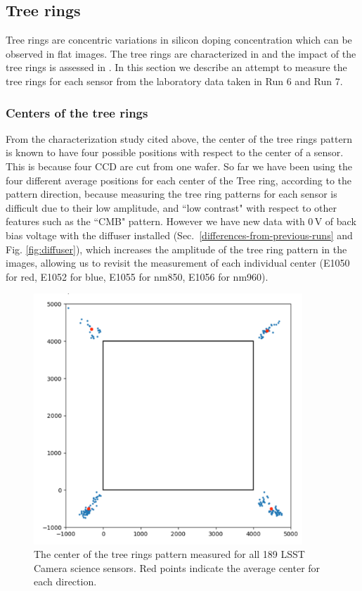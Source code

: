 \subsection{Tree rings}\label{tree-rings}
Tree rings are concentric variations in silicon doping concentration which can be observed in flat images. The tree rings are characterized in \citet{2017Jinst..12C05015,2020JATIS...6a1005P} and the impact of the tree rings is assessed in \citet{2023PASP..135k5003E}. In this section we describe an attempt to measure the tree rings for each sensor from the laboratory data taken in Run 6 and Run 7.
\subsubsection{Centers of the tree rings}
From the characterization study cited above, the center of the tree rings pattern is known to have four possible positions with respect to the center of a sensor. This is because four CCD are cut from one wafer. 
So far we have been using the four different average positions for each center of the Tree ring, according to the pattern direction, because measuring the tree ring patterns for each sensor is difficult due to their low amplitude, and ``low contrast" with respect to other features such as the ``CMB" pattern. However we have new data with 0\,V of back bias voltage with the diffuser installed (Sec.~\ref{differences-from-previous-runs} and Fig. \ref{fig:diffuser}), which increases the amplitude of the tree ring pattern in the images, allowing us to revisit the measurement of each individual center (E1050 for red, E1052 for blue, E1055 for nm850, E1056 for nm960).

\begin{figure}[ht]
\begin{centering}
\includegraphics[width=0.9\textwidth]{figures/TR_centers.png}
\end{centering}
\caption{The center of the tree rings pattern measured for all 189 LSST Camera science sensors. Red points indicate the average center for each direction.}
\label{fig:tree_ring_center}
\end{figure}

